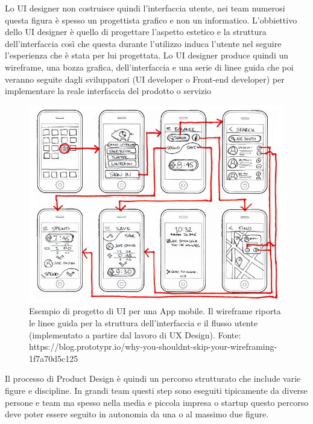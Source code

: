Lo UI designer non costruisce quindi l'interfaccia utente, nei team numerosi questa figura è spesso un progettista grafico e non un informatico. L'obbiettivo dello UI designer è quello di progettare l'aspetto estetico e la struttura dell'interfaccia così che questa durante l'utilizzo induca l'utente nel seguire l'esperienza che è stata per lui progettata.
Lo UI designer produce quindi un wireframe, una bozza grafica, dell'interfaccia e una serie di linee guida che poi veranno seguite dagli sviluppatori (UI developer o Front-end developer) per implementare la reale interfaccia del prodotto o servizio

\begin{figure}[!h]
	\centering
	\includegraphics[width=\textwidth]{immagini/uidesign.jpeg}
	\caption{Esempio di progetto di UI per una App mobile. Il wireframe riporta le linee guida per la struttura dell'interfaccia e il flusso utente (implementato a partire dal lavoro di UX Design). Fonte: https://blog.prototypr.io/why-you-shouldnt-skip-your-wireframing-1f7a70d5c125}
\end{figure}



Il processo di Product Design è quindi un percorso strutturato che include varie figure e discipline. In grandi team questi step sono eseguiti tipicamente da diverse persone e team ma spesso nella media e piccola impresa o startup questo percorso deve poter essere seguito in autonomia da una o al massimo due figure.

